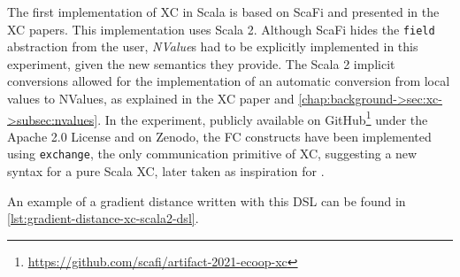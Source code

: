 The first implementation of \ac{XC} in Scala is based on ScaFi and presented in the \ac{XC} papers\cite{xc}\cite{xc-experiment-with-scafi}.
%
This implementation uses Scala 2.
%
Although ScaFi hides the \texttt{field} abstraction from the user, \textit{NValue}s had to be explicitly implemented in this experiment, given the new semantics they provide.
%
The Scala 2 implicit conversions allowed for the implementation of an automatic conversion from local values to NValues, as explained in the \ac{XC} paper and \cref{chap:background->sec:xc->subsec:nvalues}.
%
In the experiment, publicly available on GitHub\footnote{\url{https://github.com/scafi/artifact-2021-ecoop-xc}} under the Apache 2.0 License and on Zenodo\cite{xc-experiment-with-scafi-code}, the \ac{FC} constructs have been implemented using \texttt{exchange}, the only communication primitive of \ac{XC}, suggesting a new syntax for a pure Scala \ac{XC}, later taken as inspiration for \this.

An example of a gradient distance written with this DSL can be found in \cref{lst:gradient-distance-xc-scala2-dsl}.



